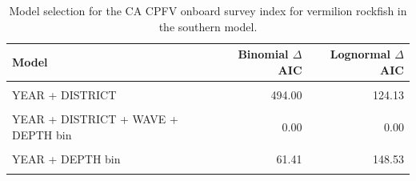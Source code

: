 \documentclass[11pt,
  english,
]{article}
\begin{document}
\FloatBarrier

\begin{table}

\caption{\label{tab:tab-model-select-cpfvonboard}Model selection for the CA CPFV onboard survey index for vermilion rockfish in the southern model.}
\centering
\begin{tabular}[t]{lrr}
\toprule
Model & Binomial $\Delta$AIC & Lognormal $\Delta$AIC\\
\midrule
\cellcolor{gray!6}{1} & \cellcolor{gray!6}{725.28} & \cellcolor{gray!6}{568.97}\\
YEAR + DISTRICT & 494.00 & 124.13\\
\cellcolor{gray!6}{YEAR + DISTRICT + WAVE} & \cellcolor{gray!6}{450.48} & \cellcolor{gray!6}{109.82}\\
YEAR + DISTRICT + WAVE + DEPTH bin & 0.00 & 0.00\\
\cellcolor{gray!6}{YEAR + WAVE + DEPTH bin} & \cellcolor{gray!6}{41.38} & \cellcolor{gray!6}{132.83}\\
\addlinespace
YEAR + DEPTH bin & 61.41 & 148.53\\
\cellcolor{gray!6}{YEAR + DISTRICT + DEPTH bin} & \cellcolor{gray!6}{10.88} & \cellcolor{gray!6}{3.65}\\
\bottomrule
\end{tabular}
\end{table}

\FloatBarrier
\end{document}
